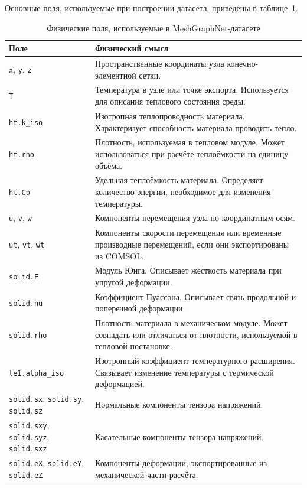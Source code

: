 Основные поля, используемые при построении датасета, приведены в таблице~\ref{tab:mgn_fields}.

\begin{table}[h]
\centering
\caption{Физические поля, используемые в MeshGraphNet-датасете}
\label{tab:mgn_fields}
\begin{tabular}{|p{}|p{}|}
\hline
\textbf{Поле} & \textbf{Физический смысл} \\
\hline
\texttt{x}, \texttt{y}, \texttt{z} & Пространственные координаты узла конечно-элементной сетки. \\
\hline
\texttt{T} & Температура в узле или точке экспорта. Используется для описания теплового состояния среды. \\
\hline
\texttt{ht.k\_iso} & Изотропная теплопроводность материала. Характеризует способность материала проводить тепло. \\
\hline
\texttt{ht.rho} & Плотность, используемая в тепловом модуле. Может использоваться при расчёте теплоёмкости на единицу объёма. \\
\hline
\texttt{ht.Cp} & Удельная теплоёмкость материала. Определяет количество энергии, необходимое для изменения температуры. \\
\hline
\texttt{u}, \texttt{v}, \texttt{w} & Компоненты перемещения узла по координатным осям. \\
\hline
\texttt{ut}, \texttt{vt}, \texttt{wt} & Компоненты скорости перемещения или временные производные перемещений, если они экспортированы из COMSOL. \\
\hline
\texttt{solid.E} & Модуль Юнга. Описывает жёсткость материала при упругой деформации. \\
\hline
\texttt{solid.nu} & Коэффициент Пуассона. Описывает связь продольной и поперечной деформации. \\
\hline
\texttt{solid.rho} & Плотность материала в механическом модуле. Может совпадать или отличаться от плотности, используемой в тепловой постановке. \\
\hline
\texttt{te1.alpha\_iso} & Изотропный коэффициент температурного расширения. Связывает изменение температуры с термической деформацией. \\
\hline
\texttt{solid.sx}, \texttt{solid.sy}, \texttt{solid.sz} & Нормальные компоненты тензора напряжений. \\
\hline
\texttt{solid.sxy}, \texttt{solid.syz}, \texttt{solid.sxz} & Касательные компоненты тензора напряжений. \\
\hline
\texttt{solid.eX}, \texttt{solid.eY}, \texttt{solid.eZ} & Компоненты деформации, экспортированные из механической части расчёта. \\
\hline
\end{tabular}
\end{table}

